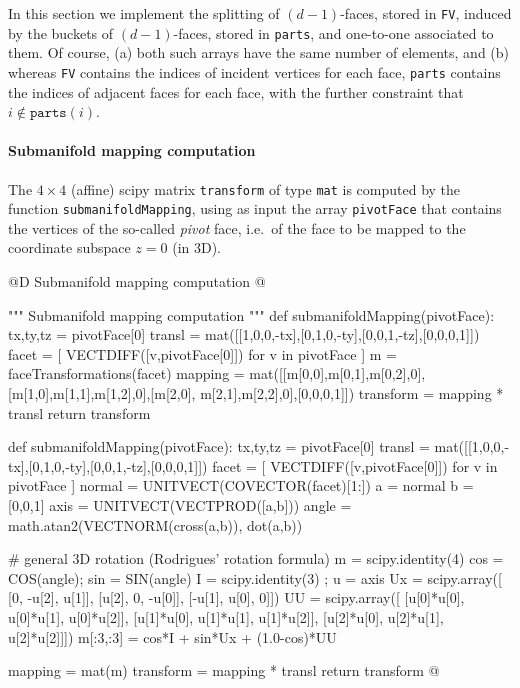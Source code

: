 \documentclass[11pt,oneside]{article}    %
\begin{document}
In this section we implement the splitting of $(d-1)$-faces, stored in \texttt{FV}, induced by the buckets of $(d-1)$-faces, stored in \texttt{parts}, and one-to-one associated to them. Of course, (a) both such arrays have the same number of elements, and (b) whereas \texttt{FV} contains the indices of incident vertices for each face, \texttt{parts}  contains the indices of adjacent faces for each face, with the further constraint that $i \not\in \texttt{parts}(i)$.
    
\paragraph{Submanifold mapping computation}
The $4\times 4$ (affine) scipy matrix \texttt{transform} of type \texttt{mat} is computed by the function \texttt{submanifoldMapping}, using as input the array \texttt{pivotFace} that contains the vertices of the so-called \emph{pivot} face, i.e.~of the face to be mapped to the coordinate subspace $z=0$ (in 3D).

@D Submanifold mapping computation
@{""" Submanifold mapping computation """
def submanifoldMapping(pivotFace):
    tx,ty,tz = pivotFace[0]
    transl = mat([[1,0,0,-tx],[0,1,0,-ty],[0,0,1,-tz],[0,0,0,1]])
    facet = [ VECTDIFF([v,pivotFace[0]]) for v in pivotFace ]
    m = faceTransformations(facet)
    mapping = mat([[m[0,0],m[0,1],m[0,2],0],[m[1,0],m[1,1],m[1,2],0],[m[2,0],
                    m[2,1],m[2,2],0],[0,0,0,1]])
    transform = mapping * transl
    return transform

def submanifoldMapping(pivotFace):
    tx,ty,tz = pivotFace[0]
    transl = mat([[1,0,0,-tx],[0,1,0,-ty],[0,0,1,-tz],[0,0,0,1]])
    facet = [ VECTDIFF([v,pivotFace[0]]) for v in pivotFace ]
    normal = UNITVECT(COVECTOR(facet)[1:])
    a = normal
    b = [0,0,1]
    axis = UNITVECT(VECTPROD([a,b]))
    angle = math.atan2(VECTNORM(cross(a,b)), dot(a,b))    
    
    # general 3D rotation (Rodrigues' rotation formula)    
    m = scipy.identity(4)
    cos = COS(angle); sin = SIN(angle)
    I = scipy.identity(3) ; u = axis
    Ux = scipy.array([
        [0,        -u[2],      u[1]],
        [u[2],        0,     -u[0]],
        [-u[1],     u[0],         0]])
    UU = scipy.array([
        [u[0]*u[0],    u[0]*u[1],    u[0]*u[2]],
        [u[1]*u[0],    u[1]*u[1],    u[1]*u[2]],
        [u[2]*u[0],    u[2]*u[1],    u[2]*u[2]]])
    m[:3,:3] = cos*I + sin*Ux + (1.0-cos)*UU
    
    mapping = mat(m)
    transform = mapping * transl
    return transform
@}
\end{document}
